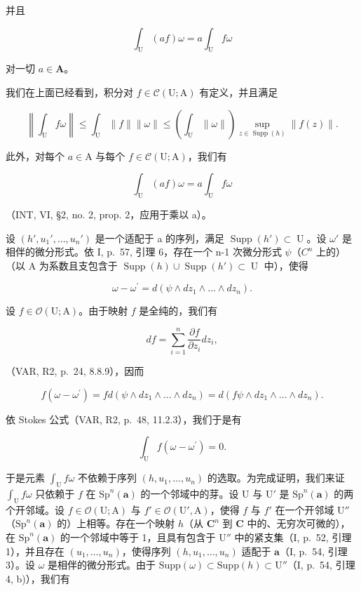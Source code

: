 并且

\[
\int_ {\mathrm{U}} (a f) \omega = a \int_ {\mathrm{U}} f \omega
\]

对一切 \(a \in \mathbf{A}\)。

我们在上面已经看到，积分对 \(f \in \mathcal{C}(\mathrm{U};\mathrm{A})\) 有定义，并且满足

\[
\left\| \int_ {\mathrm{U}} f \omega \right\| \leqslant \int_ {\mathrm{U}} \| f \| \| \omega \| \leqslant \left(\int_ {\mathrm{U}} \| \omega \|\right) \sup _ {z \in \operatorname{Supp} (h)} \| f (z) \|.
\]

此外，对每个 \(a \in \mathrm{A}\) 与每个 \(f \in \mathcal{C}(\mathrm{U};\mathrm{A})\)，我们有

\[
\int_ {\mathrm{U}} (a f) \omega = a \int_ {\mathrm{U}} f \omega
\]

（INT, VI, §2, no. 2, prop. 2，应用于乘以 a）。

设 \((h', u_{1}', \ldots, u_{n}')\) 是一个适配于 a 的序列，满足 \(\operatorname{Supp}(h') \subset \operatorname{U}\)。设 \(\omega'\) 是相伴的微分形式。依 I, p.~57, 引理 6，存在一个 n-1 次微分形式 \(\psi\)（\(C^{n}\) 上的）（以 A 为系数且支包含于 \(\operatorname{Supp}(h) \cup \operatorname{Supp}(h') \subset \operatorname{U}\) 中），使得

\[
\omega - \omega^ {\prime} = d (\psi \wedge d z _ {1} \wedge \dots \wedge d z _ {n}).
\]

设 \(f \in \mathcal{O}(\mathrm{U};\mathrm{A})\)。由于映射 \(f\) 是全纯的，我们有

\[
d f = \sum_ {i = 1} ^ {n} \frac {\partial f}{\partial z _ {i}} d z _ {i},
\]

（VAR, R2, p.~24, 8.8.9），因而

\[
f \left(\omega - \omega^ {\prime}\right) = f d \left(\psi \wedge d z _ {1} \wedge \dots \wedge d z _ {n}\right) = d \left(f \psi \wedge d z _ {1} \wedge \dots \wedge d z _ {n}\right).
\]

依 Stokes 公式（VAR, R2, p.~48, 11.2.3），我们于是有

\[
\int_ {\mathrm{U}} f (\omega - \omega^ {\prime}) = 0.
\]

于是元素 \(\int_{\mathrm{U}} f\omega\) 不依赖于序列 \((h, u_1, \ldots, u_n)\) 的选取。为完成证明，我们来证 \(\int_{\mathrm{U}} f\omega\) 只依赖于 \(f\) 在 \(\mathrm{Sp}^n(\boldsymbol{a})\) 的一个邻域中的芽。设 U 与 \(\mathrm{U}'\) 是 \(\mathrm{Sp}^n(\boldsymbol{a})\) 的两个开邻域。设 \(f \in \mathcal{O}(\mathrm{U}; \mathrm{A})\) 与 \(f' \in \mathcal{O}(\mathrm{U}', \mathrm{A})\)，使得 \(f\) 与 \(f'\) 在一个开邻域 \(\mathrm{U}''\)（\(\mathrm{Sp}^n(\boldsymbol{a})\) 的）上相等。存在一个映射 \(h\)（从 \(\mathbf{C}^n\) 到 \(\mathbf{C}\) 中的、无穷次可微的），在 \(\mathrm{Sp}^n(\boldsymbol{a})\) 的一个邻域中等于 1，且具有包含于 \(\mathrm{U}''\) 中的紧支集（I, p.~52, 引理 1），并且存在 \((u_1, \ldots, u_n)\)，使得序列 \((h, u_1, \ldots, u_n)\) 适配于 \(\boldsymbol{a}\)（I, p.~54, 引理 3）。设 \(\omega\) 是相伴的微分形式。由于 \(\mathrm{Supp}(\omega) \subset \mathrm{Supp}(h) \subset \mathrm{U}''\)（I, p.~54, 引理 4, b)），我们有

